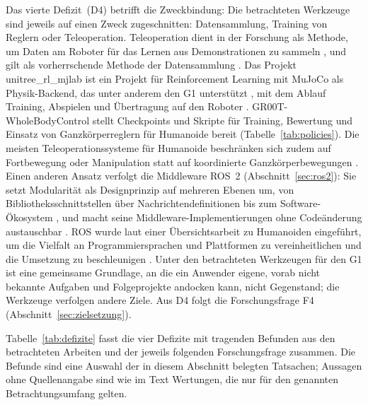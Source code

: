 Das vierte Defizit~(D4) betrifft die Zweckbindung: Die betrachteten Werkzeuge sind jeweils auf einen Zweck zugeschnitten: Datensammlung, Training von Reglern oder Teleoperation.
Teleoperation dient in der Forschung als Methode, um Daten am Roboter für das Lernen aus Demonstrationen zu sammeln \cite{Cheng2024}, und gilt als vorherrschende Methode der Datensammlung \cite{Zhao2025}.
Das Projekt unitree\_rl\_mjlab ist ein Projekt für Reinforcement Learning mit MuJoCo als Physik-Backend, das unter anderem den G1 unterstützt \cite{UnitreeRLMjlab}, mit dem Ablauf Training, Abspielen und Übertragung auf den Roboter \cite{UnitreeRLMjlab}.
GR00T-WholeBodyControl stellt Checkpoints und Skripte für Training, Bewertung und Einsatz von Ganzkörperreglern für Humanoide bereit \cite{NvidiaGR00TWBC} (Tabelle~\ref{tab:policies}).
Die meisten Teleoperationssysteme für Humanoide beschränken sich zudem auf Fortbewegung oder Manipulation statt auf koordinierte Ganzkörperbewegungen \cite{Ze2025}.
Einen anderen Ansatz verfolgt die Middleware ROS~2 (Abschnitt~\ref{sec:ros2}): Sie setzt Modularität als Designprinzip auf mehreren Ebenen um, von Bibliotheksschnittstellen über Nachrichtendefinitionen bis zum Software-Ökosystem \cite{Macenski2022}, und macht seine Middleware-Implementierungen ohne Codeänderung austauschbar \cite{Macenski2022}.
ROS wurde laut einer Übersichtsarbeit zu Humanoiden eingeführt, um die Vielfalt an Programmiersprachen und Plattformen zu vereinheitlichen und die Umsetzung zu beschleunigen \cite{Saeedvand2019}.
Unter den betrachteten Werkzeugen für den G1 ist eine gemeinsame Grundlage, an die ein Anwender eigene, vorab nicht bekannte Aufgaben und Folgeprojekte andocken kann, nicht Gegenstand; die Werkzeuge verfolgen andere Ziele.
Aus D4 folgt die Forschungsfrage F4 (Abschnitt~\ref{sec:zielsetzung}).

Tabelle~\ref{tab:defizite} fasst die vier Defizite mit tragenden Befunden aus den betrachteten Arbeiten und der jeweils folgenden Forschungsfrage zusammen.
Die Befunde sind eine Auswahl der in diesem Abschnitt belegten Tatsachen; Aussagen ohne Quellenangabe sind wie im Text Wertungen, die nur für den genannten Betrachtungsumfang gelten.

